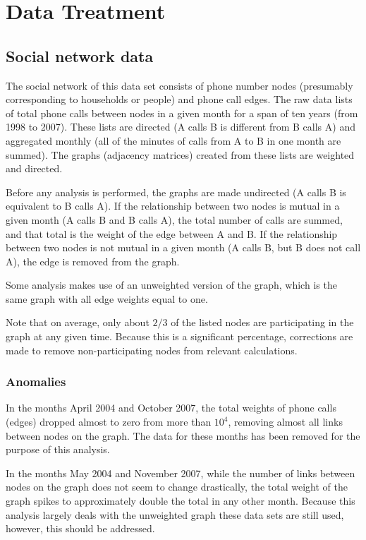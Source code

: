 \documentclass[12pt]{article}
\begin{document}
\section{Data Treatment}
\subsection{Social network data}
The social network of this data set consists of phone number nodes (presumably corresponding to households or people) and phone call edges. The raw data lists of total phone calls between nodes in a given month for a span of ten years (from 1998 to 2007). These lists are directed (A calls B is different from B calls A) and aggregated monthly (all of the minutes of calls from A to B in one month are summed). The graphs (adjacency matrices) created from these lists are weighted and directed.

Before any analysis is performed, the graphs are made undirected (A calls B is equivalent to B calls A). If the relationship between two nodes is mutual in a given month (A calls B and B calls A), the total number of calls are summed, and that total is the weight of the edge between A and B. If the relationship between two nodes is not mutual in a given month (A calls B, but B does not call A), the edge is removed from the graph. 

Some analysis makes use of an unweighted version of the graph, which is the same graph with all edge weights equal to one.

Note that on average, only about \(2/3\) of the listed nodes are participating in the graph at any given time. Because this is a significant percentage, corrections are made to remove non-participating nodes from relevant calculations.

\subsubsection{Anomalies}
In the months April 2004 and October 2007, the total weights of phone calls (edges) dropped almost to zero from more than \(10^4\), removing almost all links between nodes on the graph. The data for these months has been removed for the purpose of this analysis.

In the months May 2004 and November 2007, while the number of links between nodes on the graph does not seem to change drastically, the total weight of the graph spikes to approximately double the total in any other month. Because this analysis largely deals with the unweighted graph these data sets are still used, however, this should be addressed.
\end{document}
